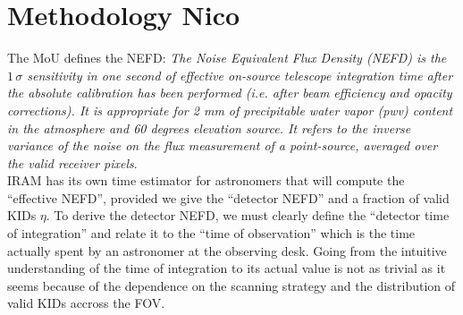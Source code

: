 


\section{Methodology {\color{YellowGreen} Nico}}

The MoU defines the NEFD:  \emph{The Noise Equivalent Flux Density (NEFD)
  is the $1\,\sigma$ sensitivity in one second of effective on-source telescope
  integration time after the absolute calibration has been performed (i.e. after
  beam efficiency and opacity corrections). It is appropriate for 2 mm of
  precipitable water vapor (pwv) content in the atmosphere and 60 degrees
  elevation source. It refers to the inverse variance of the noise on the flux
  measurement of a point-source, averaged over the valid receiver pixels}.\\

IRAM has its own time estimator for astronomers that will compute the ``effective NEFD'',
provided we give the ``detector NEFD'' and a fraction of valid KIDs $\eta$. To
derive the detector NEFD, we must clearly define the ``detector time of
integration'' and relate it to the ``time of observation'' which is the time
actually spent by an astronomer at the observing desk. Going from the intuitive
understanding of the time of integration to its actual value is not as trivial
as it seems because of the dependence on the scanning strategy and the
distribution of valid KIDs accross the FOV.

